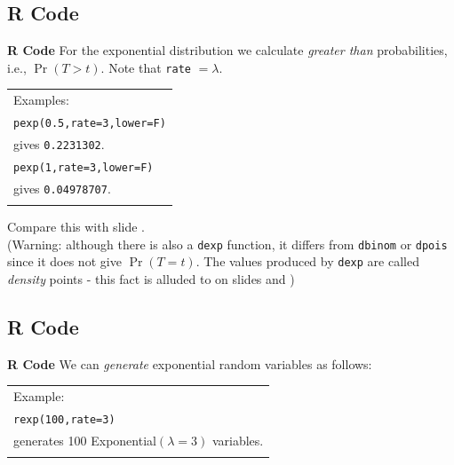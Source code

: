 \documentclass[compress]{beamer}        %
\makeatletter
\newcommand{\tcb}{\textcolor{beamer@blendedblue}}
\makeatother
\begin{document}
\subsection{R Code}
\begin{frame}{\bf \tcb{R Code}}
For the exponential distribution we calculate \emph{greater than} probabilities, i.e., $\Pr(T > t)$. Note that \texttt{rate} $= \lambda$.\\[0.4cm]

\begin{tabular}{|l|}
\hline
Examples: \\[0.2cm]
\texttt{pexp(0.5,rate=3,lower=F)} \\
gives \texttt{0.2231302}.\\[0.2cm]
\texttt{pexp(1,rate=3,lower=F)} \\
gives \texttt{0.04978707}.\\[0.2cm]
\hline
\multicolumn{1}{c}{}\\[0.0cm]
\end{tabular}

Compare this with slide \pageref{expexampletab}.\\[0.6cm]

{\footnotesize(Warning: although there is also a \texttt{dexp} function, it differs from \texttt{dbinom} or \texttt{dpois} since it does not give $\Pr(T=t)$. The values produced by \texttt{dexp} are called \emph{density} points - this fact is alluded to on slides \pageref{expplot} and \pageref{normplot})}
\end{frame}




\subsection{R Code}
\begin{frame}{\bf \tcb{R Code}}
We can \emph{generate} exponential random variables as follows:\\[0.5cm]

\begin{tabular}{|l|}
\hline
Example: \\[0.2cm]
\texttt{rexp(100,rate=3)} \\
generates 100 Exponential$(\lambda=3)$ variables.\\
\hline
\multicolumn{1}{c}{}\\[0.2cm]
\end{tabular}


\end{frame}
\end{document}
